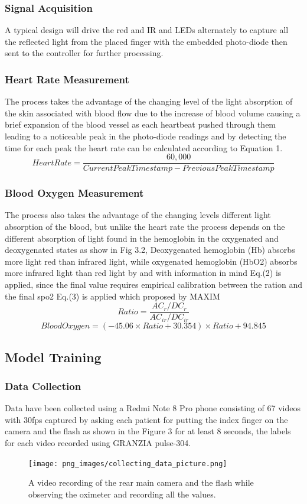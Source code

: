 \documentclass{bmcart}
\begin{document}
\subsubsection*{Signal Acquisition}
A typical design will drive the red and IR and LEDs alternately to capture all
the reflected light from the placed finger with the embedded photo-diode then
sent to the controller for further processing.\\

\subsubsection*{Heart Rate Measurement}
The process takes the advantage of the changing level of the light absorption of
the skin associated with blood flow due to the increase of blood volume causing
a brief expansion of the blood vessel as each heartbeat pushed through them
leading to a noticeable peak in the photo-diode readings and by detecting the
time for each peak the heart rate can be calculated according to Equation 1.\\
%
\[
 Heart Rate = \frac{60,000}{Current Peak Timestamp - Previous Peak Timestamp}
 \tag{1}
\]
%

\subsubsection*{Blood Oxygen Measurement}
The process also takes the advantage of  the changing levels different light
absorption of the blood, but unlike the heart rate the process depends on the
different absorption of light found in the hemoglobin in the oxygenated and
deoxygenated states as show in Fig 3.2, Deoxygenated hemoglobin (Hb) absorbs
more light red than infrared light, while oxygenated hemoglobin (HbO2) absorbs
more infrared light than red light by and with information in mind Eq.(2) is
applied, since the final value requires empirical calibration between the ration
and the final spo2 Eq.(3) is applied which proposed by MAXIM%
%
\[
 Ratio = \frac{AC_r/DC_r}{AC_{ir}/DC_{ir}}
 \tag{2}
\]
\[
 Blood Oxygen = (-45.06 \times Ratio + 30.354) \times Ratio + 94.845
 \tag{3}
\]
%

\subsection*{Model Training}
\subsubsection*{Data Collection}
Data have been collected using a Redmi Note 8 Pro phone consisting of 67 videos
with 30fps captured by asking each patient for putting the index finger on the
camera and the flash as shown in the Figure 3 for at least 8 seconds, the
labels for each video recorded using GRANZIA pulse-304.
\begin{figure}[h!]
  \texttt{[image: png\_images/collecting\_data\_picture.png]}
  \caption{
      A video recording of the rear main camera and the flash while observing
      the oximeter and recording all the values.}
\end{figure}
\FloatBarrier
\end{document}
